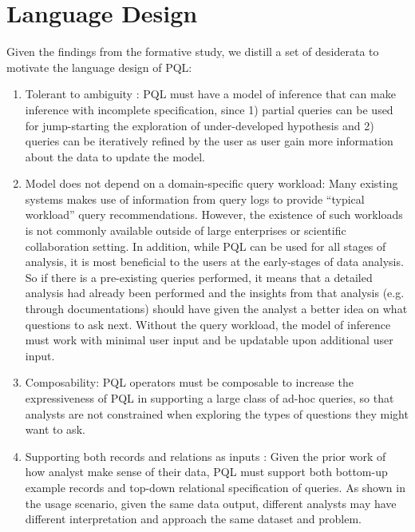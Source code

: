 \documentclass{sig-alternate-05-2015}
\begin{document}
\section{Language Design}
Given the findings from the formative study, we distill a set of desiderata to motivate the language design of PQL:
\begin{enumerate}
	\item Tolerant to ambiguity : PQL must have a model of inference that can make inference with incomplete specification, since 1) partial queries can be used for jump-starting the exploration of under-developed hypothesis and 2) queries can be iteratively refined by the user as user gain more information about the data to update the model. 
  \item Model does not depend on a domain-specific query workload: Many existing systems makes use of information from query logs to provide ``typical workload'' query recommendations\cite{Morton2014,Kamat2016,Khoussainova2010}. However, the existence of such workloads is not commonly available outside of large enterprises or scientific collaboration setting. In addition, while PQL can be used for all stages of analysis, it is most beneficial to the users at the early-stages of data analysis. So if there is a pre-existing queries performed, it means that a detailed analysis had already been performed and the insights from that analysis (e.g. through documentations) should have given the analyst a better idea on what questions to ask next. Without the query workload, the model of inference must work with minimal user input and be updatable upon additional user input.
	\item Composability: PQL operators must be composable to increase the expressiveness of PQL in supporting a large class of ad-hoc queries, so that analysts are not constrained when exploring the types of questions they might want to ask.
	\item Supporting both records and relations as inputs : Given the prior work of how analyst make sense of their data\cite{Pirolli2005,Klein2006}, PQL must support both bottom-up example records and top-down relational specification of queries. As shown in the usage scenario, given the same data output, different analysts may have different interpretation and approach the same dataset and problem. %

\end{enumerate}
\end{document}
